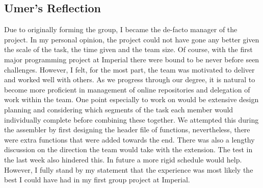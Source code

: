 \documentclass[11pt]{article}
\begin{document}
\subsection{Umer's Reflection}
Due to originally forming the group, I became the de-facto manager of the project. In my personal opinion, the project could not have gone any better given the scale of the task, the time given and the team size. Of course, with the first major programming project at Imperial there were bound to be never before seen challenges. However, I felt, for the most part, the team was motivated to deliver and worked well with others. As we progress through our degree, it is natural to become more proficient in management of online repositories and delegation of work within the team. One point especially to work on would be extensive design planning and considering which segments of the task each member would individually complete before combining these together. We attempted this during the assembler by first designing the header file of functions, nevertheless, there were extra functions that were added towards the end. There was also a lengthy discussion on the direction the team would take with the extension. The test in the last week also hindered this. In future a more rigid schedule would help. However, I fully stand by my statement that the experience was most likely the best I could have had in my first group project at Imperial. 
\end{document}
